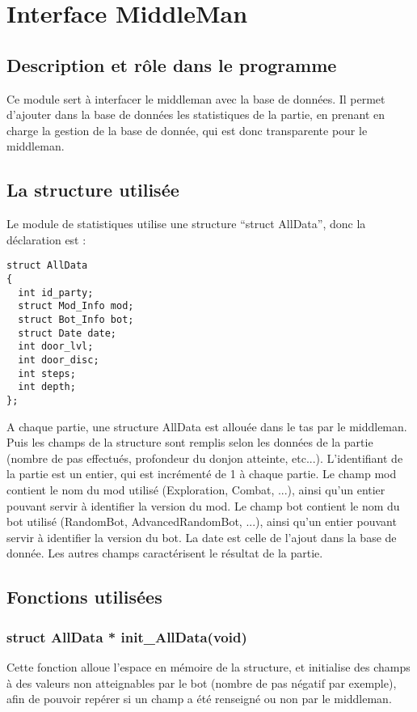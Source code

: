\section{Interface MiddleMan} 

\subsection{Description et rôle dans le programme}
Ce module sert à interfacer le middleman avec la base de données. Il permet d'ajouter dans la base de données les statistiques de la partie, en prenant en charge la gestion de la base de donnée, qui est donc transparente pour le middleman.
\subsection{La structure utilisée}
Le module de statistiques utilise une structure ``struct AllData'', donc la déclaration est :\\
\begin{verbatim}
struct AllData
{
  int id_party;
  struct Mod_Info mod;
  struct Bot_Info bot;
  struct Date date;
  int door_lvl;
  int door_disc;
  int steps;
  int depth;
};
\end{verbatim}
A chaque partie, une structure AllData est allouée dans le tas par le middleman. Puis les champs de la structure sont remplis selon les données de la partie (nombre de pas effectués, profondeur du donjon atteinte, etc...). L'identifiant de la partie est un entier, qui est incrémenté de 1 à chaque partie. Le champ mod contient le nom du mod utilisé (Exploration, Combat, ...), ainsi qu'un entier pouvant servir à identifier la version du mod. Le champ bot contient le nom du bot utilisé (RandomBot, AdvancedRandomBot, ...), ainsi qu'un entier pouvant servir à identifier la version du bot. La date est celle de l'ajout dans la base de donnée. Les autres champs caractérisent le résultat de la partie.
\subsection{Fonctions utilisées}
\subsubsection{struct AllData * init\_AllData(void)}
Cette fonction alloue l'espace en mémoire de la structure, et initialise des champs à des valeurs non atteignables par le bot (nombre de pas négatif par exemple), afin de pouvoir repérer si un champ a été renseigné ou non par le middleman.
